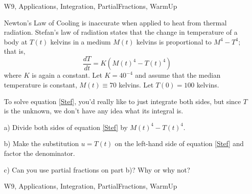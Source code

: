 
\begin{tagblock}{W9, Applications, Integration, PartialFractions, WarmUp}
\begin{question}
	


Newton's Law of Cooling is inaccurate when applied to heat from thermal radiation. Stefan's law of radiation states that the change in temperature of a body at $T(t)$ kelvins in a medium $M(t)$ kelvins is proportional to $M^4-T^4$; that is,
\begin{equation}\label{Stef}
\frac{dT}{dt}=K(M(t)^4-T(t)^4)
\end{equation}
where $K$ is again a constant. Let $K=40^{-4}$ and assume that the median temperature is constant, $M(t)\equiv 70$ kelvins. Let $T(0)=100$ kelvins.

To solve equation \eqref{Stef}, you'd really like to just integrate both sides, but since $T$ is the unknown, we don't have any idea what its integral is. 

\bigskip

a) Divide both sides of equation \eqref{Stef} by $M(t)^4-T(t)^4$. 
 
\bigskip

b) Make the substitution $u=T(t)$ on the left-hand side of equation \eqref{Stef} and factor the denominator. 

\bigskip

c) Can you use partial fractions on part b)? Why or why not? 

    
\begin{tags}
       W9, Applications, Integration, PartialFractions, WarmUp
\end{tags}
    
\begin{diary}
\end{diary}
	
\begin{solution}

\end{solution}
	
\end{question}

\end{tagblock}

